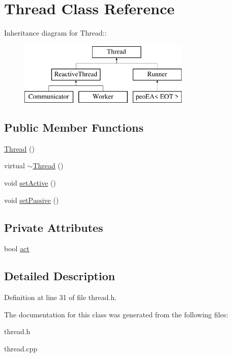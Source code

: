 \hypertarget{classThread}{
\section{Thread Class Reference}
\label{classThread}
}
Inheritance diagram for Thread::\begin{figure}[H]
\begin{center}
\leavevmode
\includegraphics[height=3cm]{classThread}
\end{center}
\end{figure}
\subsection*{Public Member Functions}
\begin{CompactItemize}
\item 
\hypertarget{classThread_95c703fb8f2f27cb64f475a8c940864a}{
\hyperlink{classThread_95c703fb8f2f27cb64f475a8c940864a}{Thread} ()}
\label{classThread_95c703fb8f2f27cb64f475a8c940864a}

\item 
\hypertarget{classThread_37d9edd3a1a776cbc27dedff949c9726}{
virtual \hyperlink{classThread_37d9edd3a1a776cbc27dedff949c9726}{$\sim$Thread} ()}
\label{classThread_37d9edd3a1a776cbc27dedff949c9726}

\item 
\hypertarget{classThread_e197c46f8f62ecce6d2a7fe95bdc5b38}{
void \hyperlink{classThread_e197c46f8f62ecce6d2a7fe95bdc5b38}{set\-Active} ()}
\label{classThread_e197c46f8f62ecce6d2a7fe95bdc5b38}

\item 
\hypertarget{classThread_20632ffe9ddfa2a478afb0c84dc1096b}{
void \hyperlink{classThread_20632ffe9ddfa2a478afb0c84dc1096b}{set\-Passive} ()}
\label{classThread_20632ffe9ddfa2a478afb0c84dc1096b}

\end{CompactItemize}
\subsection*{Private Attributes}
\begin{CompactItemize}
\item 
\hypertarget{classThread_1b155d63bca3096ac4a1d039aea83c7c}{
bool \hyperlink{classThread_1b155d63bca3096ac4a1d039aea83c7c}{act}}
\label{classThread_1b155d63bca3096ac4a1d039aea83c7c}

\end{CompactItemize}


\subsection{Detailed Description}




Definition at line 31 of file thread.h.

The documentation for this class was generated from the following files:\begin{CompactItemize}
\item 
thread.h\item 
thread.cpp\end{CompactItemize}
